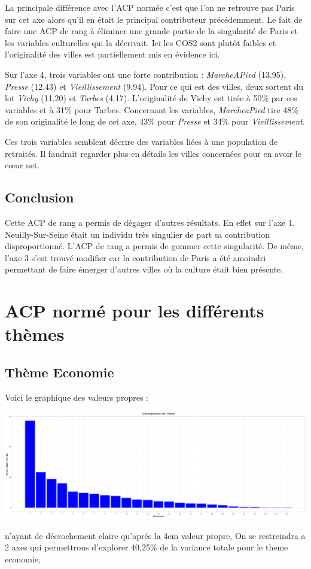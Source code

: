 \documentclass{article}
\begin{document}
La principale différence avec l'ACP normée c'est que l'on ne retrouve pas Paris sur cet axe alors qu'il en était le principal contributeur précédemment. Le fait de faire une ACP de rang à éliminer une grande partie de la singularité de Paris et les variables culturelles qui la décrivait. Ici les COS2 sont plutôt faibles et l'originalité des villes est partiellement mis en évidence ici.

\bigskip

Sur l'axe 4, trois variables ont une forte contribution : \emph{MarcheAPied} (13.95), \emph{Presse} (12.43) et \emph{Vieillissement} (9.94). Pour ce qui est des villes, deux sortent du lot \emph{Vichy} (11.20) et \emph{Tarbes} (4.17). L'originalité de Vichy est tirée à 50\% par ces variables et à 31\% pour Tarbes. Concernant les variables, \emph{MarcheaPied} tire 48\% de son originalité le long de cet axe, 43\% pour \emph{Presse} et 34\% pour \emph{Vieillissement}. 

\bigskip

Ces trois variables semblent décrire des variables liées à une population de retraités. Il faudrait regarder plus en détails les villes concernées pour en avoir le c\oe ur net. 

\subsection{Conclusion}

Cette ACP de rang a permis de dégager d'autres résultats. En effet sur l'axe 1, Neuilly-Sur-Seine était un individu très singulier de part sa contribution disproportionné. L'ACP de rang a permis de gommer cette singularité. De même, l'axe 3 s'est trouvé modifier car la contribution de Paris a été amoindri permettant de faire émerger d'autres villes où la culture était bien présente. 


\section{ACP normé pour les différents thèmes}

\subsection{Thème Economie} 
Voici le graphique des valeurs propres :

\centerline{\includegraphics[width=0.8\linewidth]{images/VP1}}
n'ayant de décrochement claire qu'aprés la 4em valeur propre,
On se restreindra a 2 axes qui permettrons d'explorer 40,25\% de la variance totale pour le theme economie,
\end{document}
